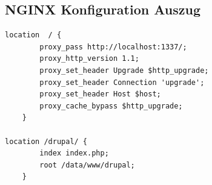 \documentclass[11pt,a4paper]{article}
\begin{document}
\begin{appendices}
\subsection{NGINX Konfiguration Auszug}
\label{sec:nginx}
\begin{lstlisting}[frame=single,   basicstyle=\footnotesize]
location  / {
        proxy_pass http://localhost:1337/;
        proxy_http_version 1.1;
        proxy_set_header Upgrade $http_upgrade;
        proxy_set_header Connection 'upgrade';
        proxy_set_header Host $host;
        proxy_cache_bypass $http_upgrade;
    }

location /drupal/ {
        index index.php;
        root /data/www/drupal;
    }
\end{lstlisting}
\end{appendices}
\end{document}

